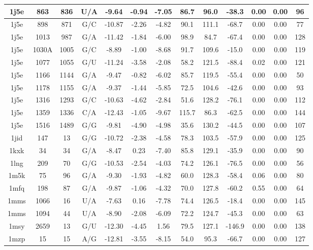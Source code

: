 {\begin{center}
\begin{longtable}{|c|c|c|c|c|c|c|c|c|c|c|c|c|}
1j5e & 863 & 836 & U/A & -9.64 & -0.94 & -7.05 & 86.7 & 96.0 & -38.3 & 0.00 & 0.00 & 96 \\ \hline
1j5e & 898 & 871 & G/C & -10.87 & -2.26 & -4.82 & 90.1 & 111.1 & -68.7 & 0.00 & 0.00 & 77 \\ \hline
1j5e & 1013 & 987 & G/A & -11.42 & -1.84 & -6.00 & 98.9 & 84.7 & -67.4 & 0.00 & 0.00 & 128 \\ \hline
1j5e & 1030A & 1005 & G/C & -8.89 & -1.00 & -8.68 & 91.7 & 109.6 & -15.0 & 0.00 & 0.00 & 119 \\ \hline
1j5e & 1077 & 1055 & G/U & -11.24 & -3.58 & -2.08 & 58.2 & 121.5 & -88.4 & 0.02 & 0.00 & 121 \\ \hline
1j5e & 1166 & 1144 & G/A & -9.47 & -0.82 & -6.02 & 85.7 & 119.5 & -55.4 & 0.00 & 0.00 & 50 \\ \hline
1j5e & 1178 & 1155 & G/A & -9.37 & -1.44 & -5.85 & 72.5 & 104.6 & -42.6 & 0.00 & 0.00 & 93 \\ \hline
1j5e & 1316 & 1293 & G/C & -10.63 & -4.62 & -2.84 & 51.6 & 128.2 & -76.1 & 0.00 & 0.00 & 112 \\ \hline
1j5e & 1359 & 1336 & C/A & -12.43 & -1.05 & -9.67 & 115.7 & 86.3 & -62.5 & 0.00 & 0.00 & 144 \\ \hline
1j5e & 1516 & 1489 & G/G & -9.81 & -4.90 & -4.98 & 35.6 & 130.2 & -44.5 & 0.00 & 0.00 & 107 \\ \hline
1jid & 147 & 13 & G/G & -10.72 & -2.38 & -4.58 & 78.3 & 103.5 & -57.9 & 0.00 & 0.00 & 125 \\ \hline
1kxk & 34 & 34 & G/A & -8.47 & 0.23 & -7.40 & 85.8 & 129.1 & -35.9 & 0.00 & 0.00 & 90 \\ \hline
1lng & 209 & 70 & G/G & -10.53 & -2.54 & -4.03 & 74.2 & 126.1 & -76.5 & 0.00 & 0.00 & 56 \\ \hline
1m5k & 75 & 96 & G/A & -9.30 & -1.93 & -4.82 & 60.0 & 128.3 & -58.4 & 0.06 & 0.00 & 80 \\ \hline
1mfq & 198 & 87 & G/A & -9.87 & -1.06 & -4.32 & 70.0 & 127.8 & -60.2 & 0.55 & 0.00 & 64 \\ \hline
1mms & 1066 & 16 & U/A & -7.63 & 0.16 & -7.78 & 74.4 & 126.5 & -18.4 & 0.00 & 0.00 & 145 \\ \hline
1mms & 1094 & 44 & U/A & -8.90 & -2.08 & -6.09 & 72.2 & 124.7 & -45.3 & 0.00 & 0.00 & 63 \\ \hline
1msy & 2659 & 13 & G/U & -12.30 & -4.45 & 1.56 & 79.5 & 127.1 & -146.9 & 0.00 & 0.00 & 138 \\ \hline
1mzp & 15 & 15 & A/G & -12.81 & -3.55 & -8.15 & 54.0 & 95.3 & -66.7 & 0.00 & 0.00 & 127 \\ \hline

\end{longtable}
\end{center}}
